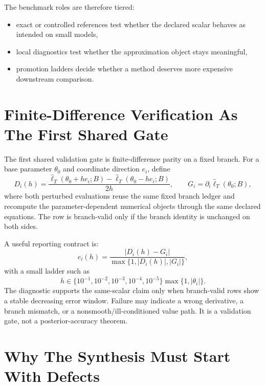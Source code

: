The benchmark roles are therefore tiered:
\begin{itemize}[leftmargin=0.28in]
  \item exact or controlled references test whether the declared scalar behaves
  as intended on small models,
  \item local diagnostics test whether the approximation object stays meaningful,
  \item promotion ladders decide whether a method deserves more expensive
  downstream comparison.
\end{itemize}

\section{Finite-Difference Verification As The First Shared Gate}
\label{sec:bf-hd-validation-fd-first}

The first shared validation gate is finite-difference parity on a fixed branch.
For a base parameter \(\theta_0\) and coordinate direction \(e_i\), define
\begin{equation}
  D_i(h)=
  \frac{\widehat\ell_T(\theta_0+h e_i;B)-\widehat\ell_T(\theta_0-h e_i;B)}{2h},
  \qquad
  G_i=\partial_i\widehat\ell_T(\theta_0;B),
  \label{eq:bf-hd-validation-fd}
\end{equation}
where both perturbed evaluations reuse the same fixed branch ledger and
recompute the parameter-dependent numerical objects through the same declared
equations.  The row is branch-valid only if the branch identity is unchanged on
both sides.

A useful reporting contract is:
\begin{equation}
  e_i(h)=\frac{|D_i(h)-G_i|}{\max\{1,|D_i(h)|,|G_i|\}},
  \label{eq:bf-hd-validation-fd-error}
\end{equation}
with a small ladder such as
\begin{equation}
  h\in\{10^{-1},10^{-2},10^{-3},10^{-4},10^{-5}\}\max\{1,|\theta_i|\}.
  \label{eq:bf-hd-validation-fd-ladder}
\end{equation}
The diagnostic supports the same-scalar claim only when branch-valid rows show a
stable decreasing error window.  Failure may indicate a wrong derivative, a
branch mismatch, or a nonsmooth/ill-conditioned value path.  It is a validation
gate, not a posterior-accuracy theorem.

\section{Why The Synthesis Must Start With Defects}
\label{sec:bf-hd-synthesis-purpose}

